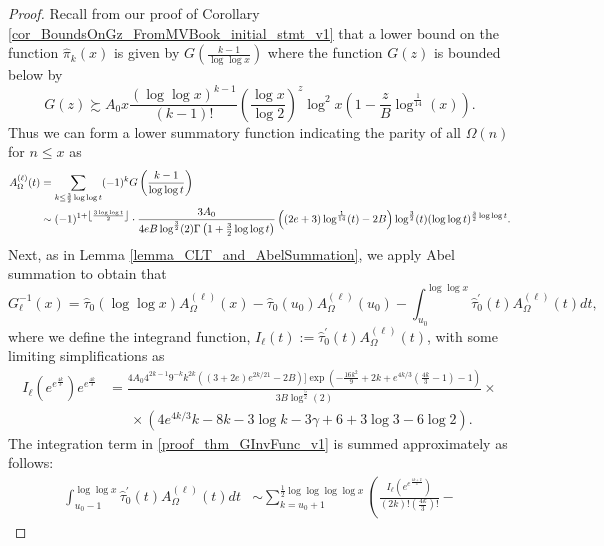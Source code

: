 \documentclass[11pt,reqno,a4letter]{article}
\numberwithin{figure}{section}
\numberwithin{table}{section}
\newcommand{\Floor}[2]{\ensuremath{\left\lfloor \frac{#1}{#2} \right\rfloor}}
\theoremstyle{plain}
\numberwithin{theorem}{section}
\theoremstyle{definition}
\newcommand{\NBRef}[1]{
     \todo[linecolor=green!85!white,backgroundcolor=orange!50!white,bordercolor=blue!30!black,textcolor=cyan!15!black,shadow,size=\small,fancyline]{
     \color{NBRefColor}{\textbf{#1}
     }
     }
}
\begin{document}
\NBRef{A10-2020.04-26} 
\begin{proof} 
Recall from our proof of Corollary \ref{cor_BoundsOnGz_FromMVBook_initial_stmt_v1} that 
a lower bound on the function $\widehat{\pi}_k(x)$ is given by $G\left(\frac{k-1}{\log\log x}\right)$ 
where the function $G(z)$ is bounded below by 
\[
G(z) \succsim A_0 x \frac{(\log\log x)^{k-1}}{(k-1)!} \left(\frac{\log x}{\log 2}\right)^{z} \log^2 x \left( 
     1 - \frac{z}{B} \log^{\frac{1}{14}}(x)\right). 
\]
Thus we can form a lower summatory function indicating the parity of all 
$\Omega(n)$ for $n \leq x$ as 
\begin{align} 
\label{proof_thm_GInvFunc_v0} 
A_{\Omega}^{(\ell)}(t) & = \sum_{k \leq \frac{3}{2}\log\log t} (-1)^k G\left(\frac{k-1}{\log\log t}\right) \\ 
\notag
     & \sim (-1)^{1+\Floor{3\log\log t}{2}} \cdot 
     \frac{3A_0}{4eB \log^{\frac{3}{2}}(2) \Gamma\left(1 + \frac{3}{2}\log\log t\right)} \left( 
     (2e+3) \log^{\frac{1}{14}}(t) - 2B\right) 
     \log^{\frac{3}{2}}(t) (\log\log t)^{\frac{3}{2}\log\log t}. 
\end{align} 
Next, as in Lemma \ref{lemma_CLT_and_AbelSummation}, we apply Abel summation to obtain that  
\begin{equation} 
\label{proof_thm_GInvFunc_v1} 
G_{\ell}^{-1}(x) = \widehat{\tau}_0(\log\log x) A_{\Omega}^{(\ell)}(x) - 
     \widehat{\tau}_0(u_0) A_{\Omega}^{(\ell)}(u_0) - \int_{u_0}^{\log\log x} 
     \widehat{\tau}_0^{\prime}(t) A_{\Omega}^{(\ell)}(t) dt, 
\end{equation} 
where we define the integrand function, 
$I_{\ell}(t) := \widehat{\tau}_0^{\prime}(t) A_{\Omega}^{(\ell)}(t)$, 
with some limiting simplifications as 
\begin{align*} 
I_{\ell}\left(e^{e^{\frac{4k}{3}}}\right) e^{e^{\frac{4k}{3}}} & = 
     \frac{4A_0 4^{2 k-1} 9^{-k} k^{2k} \left((3+2 e) e^{2k/21}-2 B\right) ]
     \exp \left(-\frac{16 k^2}{9}+2k+e^{4k/3} 
     \left(\frac{4k}{3}-1\right)-1\right)}{3B \log ^{\frac{5}{2}}(2)} \times \\ 
     & \phantom{=\ } \times 
     \left(4 e^{4 k/3} k-8k-3 \log k-3 \gamma +6+3 
     \log 3-6 \log 2\right).
\end{align*} 
The integration term in \eqref{proof_thm_GInvFunc_v1} is summed approximately as follows: 
\begin{align*} 
\int_{u_0-1}^{\log\log x} \widehat{\tau}_0^{\prime}(t) A_{\Omega}^{(\ell)}(t) dt & \sim 
     \sum_{k=u_0+1}^{\frac{1}{2}\log\log\log\log x} \left( 
     \frac{I_{\ell}\left(e^{e^{\frac{4k+2}{3}}}\right)}{(2k)! \left(\frac{4k}{3}\right)!} - 

\end{align*}
\end{proof}
\end{document}
